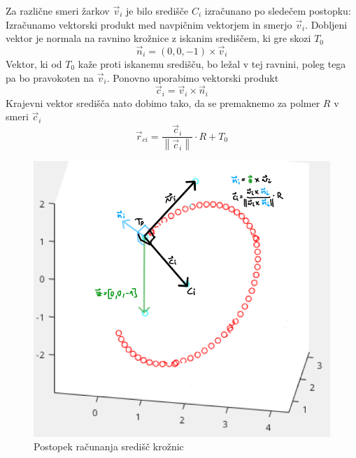 \documentclass[titlepage]{article}
\begin{document}
Za različne smeri žarkov \(\vec{v}_{i} \) je bilo središče \( C_{i} \) izračunano po sledečem postopku:
\bigskip
\newline
Izračunamo vektorski produkt med navpičnim vektorjem in smerjo \( \vec{v}_{i} \). Dobljeni vektor je normala na ravnino krožnice z iskanim središčem, ki gre skozi \( T_{0} \)
\begin{equation} \label{e:sphC1}
    \vec{n}_{i}=(0, 0, -1) \times \vec{v}_{i}
\end{equation}
Vektor, ki od \( T_{0} \) kaže proti iskanemu središču, bo ležal v tej ravnini, poleg tega pa bo pravokoten na \( \vec{v}_{i} \). Ponovno uporabimo vektorski
produkt
\begin{equation}\label{e:sphC2}
    \vec{c}_{i}= \vec{v}_{i} \times \vec{n}_{i}
\end{equation}
Krajevni vektor središča nato dobimo tako, da se premaknemo za polmer \( R \) v smeri \( \vec{c}_{i} \)
\begin{equation}\label{e:sphC3}
    \vec{r}_{ci}=\frac{\vec{c}_{i}}{\left \| \vec{c}_{i}\right \|} \cdot R + T_{0}
\end{equation}

\begin{figure}[H]
    \centering
    \includegraphics[width=0.8\linewidth]{Images/sredisca.png}
    \caption{Postopek računanja središč krožnic}
    \label{fig:centers}
\end{figure}
\end{document}

